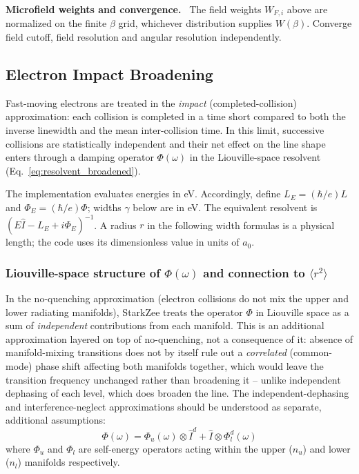 \documentclass[11pt,a4paper]{article}
\newenvironment{implnote}[1][Implementation]{%
  \par\smallskip\noindent\begin{lrbox}{\notebox}\setlength{\fboxsep}{6pt}\begin{minipage}{\dimexpr\linewidth-2\fboxsep-2\fboxrule\relax}\small\textbf{#1.}\ }{%
  \end{minipage}\end{lrbox}\setlength{\fboxsep}{6pt}\fcolorbox{noteframe}{notebg}{\usebox{\notebox}}\par\smallskip}
\numberwithin{equation}{section}
\begin{document}
\begin{implnote}[Microfield weights and convergence]
The field weights $W_{F,i}$ above are normalized on the finite $\beta$ grid, whichever distribution supplies $W(\beta)$.
Converge field cutoff, field resolution and angular resolution independently.
\end{implnote}

\subsection{Electron Impact Broadening}
\label{sec:electron_impact}
Fast-moving electrons are treated in the \emph{impact} (completed-collision) approximation: each collision is completed in a time short compared to both the inverse linewidth and the mean inter-collision time. In this limit, successive collisions are statistically independent and their net effect on the line shape enters through a damping operator $\Phi(\omega)$ in the Liouville-space resolvent (Eq.~\ref{eq:resolvent_broadened}).

The implementation evaluates energies in eV. Accordingly, define
$L_E=(\hbar/e)L$ and $\Phi_E=(\hbar/e)\Phi$; widths $\gamma$ below are in eV.
The equivalent resolvent is $(E\hat I-L_E+i\Phi_E)^{-1}$. A radius $r$ in the
following width formulas is a physical length; the code uses its dimensionless
value in units of $a_0$.

\subsubsection{\texorpdfstring{Liouville-space structure of $\Phi(\omega)$ and connection to $\langle r^2\rangle$}{Liouville-space structure of Phi(omega) and connection to mean-square radius}}
In the no-quenching approximation (electron collisions do not mix the upper and lower radiating manifolds), StarkZee treats the operator $\Phi$ in Liouville space as a sum of \emph{independent} contributions from each manifold.  This is an additional approximation layered on top of no-quenching, not a consequence of it: absence of manifold-mixing transitions does not by itself rule out a \emph{correlated} (common-mode) phase shift affecting both manifolds together, which would leave the transition frequency unchanged rather than broadening it -- unlike independent dephasing of each level, which does broaden the line.  The independent-dephasing and interference-neglect approximations should be understood as separate, additional assumptions:
\begin{equation}
\label{eq:phi_liouville}
\Phi(\omega) = \Phi_u(\omega)\otimes\hat{I}^d + \hat{I}\otimes\Phi_l^d(\omega)
\end{equation}
where $\Phi_u$ and $\Phi_l$ are self-energy operators acting within the upper ($n_u$) and lower ($n_l$) manifolds respectively.
\end{document}
